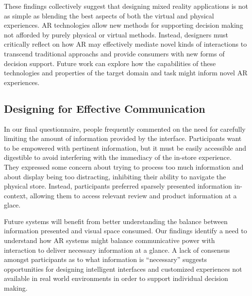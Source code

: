 These findings collectively suggest that designing mixed reality applications is not as simple as blending the best aspects of both the virtual and physical experiences. AR technologies allow new methods for supporting decision making not afforded by purely physical or virtual methods. Instead, designers must critically reflect on how AR may effectively mediate novel kinds of interactions to transcend traditional approachs and provide consumers with new forms of decision support. Future work can explore how the capabilities of these technologies and properties of the target domain and task might inform novel AR experiences.

\subsection{Designing for Effective Communication}
In our final questionnaire, people frequently commented on the need for carefully limiting the amount of information provided by the interface.  %
Participants want to be empowered with pertinent information, but it must be easily accessible and digestible to avoid interfering with the immediacy of the in-store experience. They expressed some concern about trying to process too much information and about display being too distracting, inhibiting their ability to navigate the physical store. Instead, participants preferred sparsely presented information in-context, allowing them to access relevant review and product information at a glace. 

Future systems will benefit from better understanding the balance between information presented and visual space consumed. 
Our findings identify a need to understand how AR systems might balance communicative power with interaction to deliver necessary information at a glance. A lack of consensus amongst participants as to what information is ``necessary'' suggests opportunities for designing intelligent interfaces and customized experiences not available in real world environments in order to support individual decision making. 

